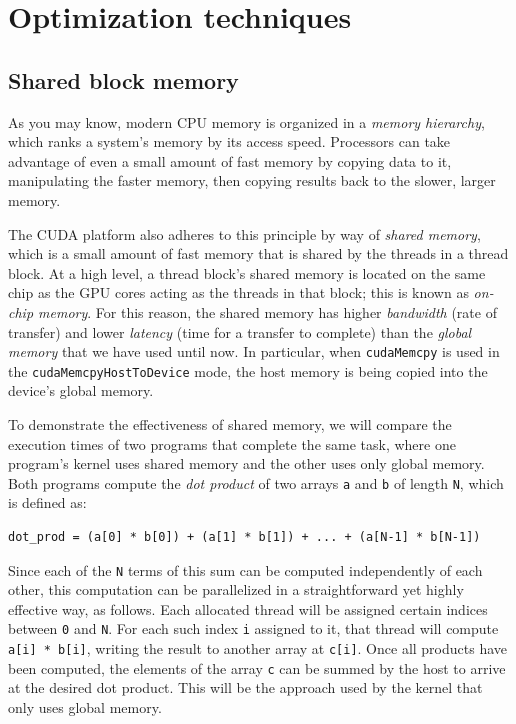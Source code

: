 \documentclass{article}
\theoremstyle{definition}
\begin{document}
\section{Optimization techniques}
\label{sec/optimization}
\subsection{Shared block memory}
\label{subsec/shared-block-memory}
As you may know, modern CPU memory is organized in a \emph{memory hierarchy}, which ranks a system's memory by its access speed. Processors can take advantage of even a small amount of fast memory by copying data to it, manipulating the faster memory, then copying results back to the slower, larger memory. 

The CUDA platform also adheres to this principle by way of \emph{shared memory}, which is a small amount of fast memory that is shared by the threads in a thread block. At a high level, a thread block's shared memory is located on the same chip as the GPU cores acting as the threads in that block; this is known as \emph{on-chip memory}. For this reason, the shared memory has higher \emph{bandwidth} (rate of transfer) and lower \emph{latency} (time for a transfer to complete) than the \emph{global memory} that we have used until now. In particular, when \texttt{cudaMemcpy} is used in the \texttt{cudaMemcpyHostToDevice} mode, the host memory is being copied into the device's global memory.

To demonstrate the effectiveness of shared memory, we will compare the execution times of two programs that complete the same task, where one program's kernel uses shared memory and the other uses only global memory. Both programs compute the \emph{dot product} of two arrays \texttt{a} and \texttt{b} of length \texttt{N}, which is defined as:
\begin{verbatim}
dot_prod = (a[0] * b[0]) + (a[1] * b[1]) + ... + (a[N-1] * b[N-1])
\end{verbatim}

Since each of the \texttt{N} terms of this sum can be computed independently of each other, this computation can be parallelized in a straightforward yet highly effective way, as follows. Each allocated thread will be assigned certain indices between \texttt{0} and \texttt{N}. For each such index \texttt{i} assigned to it, that thread will compute \texttt{a[i] * b[i]}, writing the result to another array at \texttt{c[i]}. Once all products have been computed, the elements of the array \texttt{c} can be summed by the host to arrive at the desired dot product. This will be the approach used by the kernel that only uses global memory.
\end{document}
